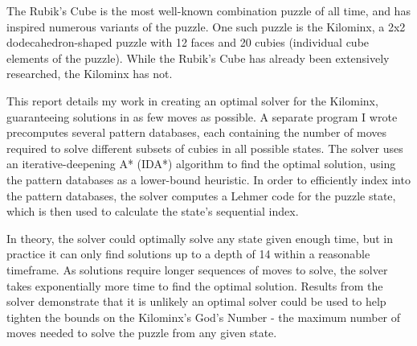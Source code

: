 The Rubik's Cube is the most well-known combination puzzle of all time, and has inspired numerous variants of the puzzle. One such puzzle is the Kilominx, a 2x2 dodecahedron-shaped puzzle with 12 faces and 20 cubies (individual cube elements of the puzzle). While the Rubik's Cube has already been extensively researched, the Kilominx has not.

This report details my work in creating an optimal solver for the Kilominx, guaranteeing solutions in as few moves as possible. A separate program I wrote precomputes several pattern databases, each containing the number of moves required to solve different subsets of cubies in all possible states. The solver uses an iterative-deepening A* (IDA*) algorithm to find the optimal solution, using the pattern databases as a lower-bound heuristic. In order to efficiently index into the pattern databases, the solver computes a Lehmer code for the puzzle state, which is then used to calculate the state's sequential index.

In theory, the solver could optimally solve any state given enough time, but in practice it can only find solutions up to a depth of 14 within a reasonable timeframe. As solutions require longer sequences of moves to solve, the solver takes exponentially more time to find the optimal solution. Results from the solver demonstrate that it is unlikely an optimal solver could be used to help tighten the bounds on the Kilominx's God's Number - the maximum number of moves needed to solve the puzzle from any given state.